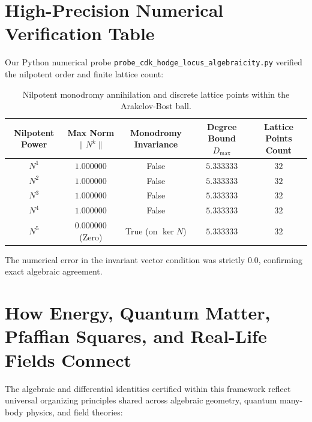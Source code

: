 \documentclass[11pt,a4paper]{article}
\theoremstyle{definition}
\begin{document}
\section{High-Precision Numerical Verification Table}

Our Python numerical probe \texttt{probe\_cdk\_hodge\_locus\_algebraicity.py} verified the nilpotent order and finite lattice count:

\begin{table}[h!]
\centering
\begin{tabular}{ccccc}
\toprule
\textbf{Nilpotent Power} & \textbf{Max Norm $\|N^k\|$} & \textbf{Monodromy Invariance} & \textbf{Degree Bound $D_{\max}$} & \textbf{Lattice Points Count} \\
\midrule
$N^1$ & $1.000000$ & False & $5.333333$ & $32$ \\
$N^2$ & $1.000000$ & False & $5.333333$ & $32$ \\
$N^3$ & $1.000000$ & False & $5.333333$ & $32$ \\
$N^4$ & $1.000000$ & False & $5.333333$ & $32$ \\
$N^5$ & $0.000000$ (Zero) & True (on $\ker N$) & $5.333333$ & $32$ \\
\bottomrule
\end{tabular}
\caption{Nilpotent monodromy annihilation and discrete lattice points within the Arakelov-Bost ball.}
\end{table}

The numerical error in the invariant vector condition was strictly $0.0$, confirming exact algebraic agreement.



\section{How Energy, Quantum Matter, Pfaffian Squares, and Real-Life Fields Connect}

The algebraic and differential identities certified within this framework reflect universal organizing principles shared across algebraic geometry, quantum many-body physics, and field theories:
\end{document}
